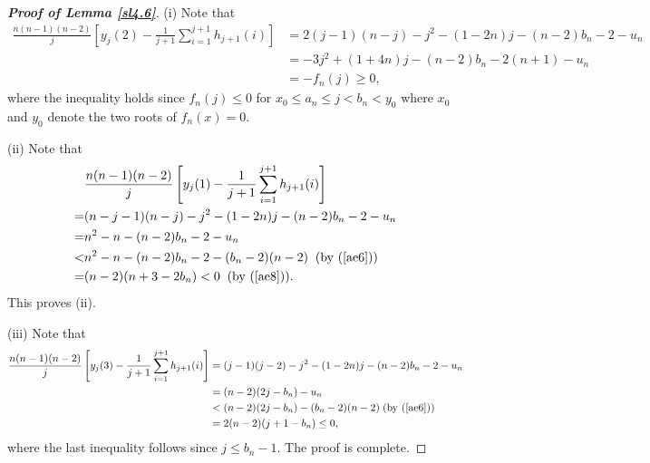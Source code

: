 \documentclass[12pt, A4paper, oneside]{article}
\theoremstyle{plain}
\numberwithin{equation}{section}
\begin{document}
\begin{proof}[\bf Proof of Lemma \ref{sl4.6}]
(i) Note that
\begin{align*}
\frac{n(n-1)(n-2)}{j}\left[y_j(2)-\frac{1}{j+1}\sum_{i=1}^{j+1}h_{j+1}(i)\right]&=2(j-1)(n-j)-j^2-(1-2n)j-(n-2)b_n-2-u_n\\
&=-3j^2+(1+4n)j-(n-2)b_n-2(n+1)-u_n\\
&=-f_n(j)\ge0,
\end{align*}
where the inequality holds since $f_n(j)\le0$ for $x_0\le a_n\le j<b_n<y_0$ where $x_0$ and $y_0$ denote the two roots of $f_n(x)=0$.

(ii) Note that
\begin{align*}
&\frac{n(n-1)(n-2)}{j}\left[y_j(1)-\frac{1}{j+1}\sum_{i=1}^{j+1}h_{j+1}(i)\right]\\
=&(n-j-1)(n-j)-j^2-(1-2n)j-(n-2)b_n-2-u_n\\
=&n^2-n-(n-2)b_n-2-u_n\\
<&n^2-n-(n-2)b_n-2-(b_n-2)(n-2)\;\;\mbox{(by (\ref{ae6}))}\\
=&(n-2)(n+3-2b_n)<0\;\;\mbox{(by (\ref{ae8}))}.
\end{align*}
This proves (ii).

(iii) Note that
\begin{align*}
\frac{n(n-1)(n-2)}{j}\left[y_j(3)-\frac{1}{j+1}\sum_{i=1}^{j+1}h_{j+1}(i)\right]&=(j-1)(j-2)-j^2-(1-2n)j-(n-2)b_n-2-u_n\\
&=(n-2)(2j-b_n)-u_n\\
&<(n-2)(2j-b_n)-(b_n-2)(n-2)\;\mbox{(by (\ref{ae6}))}\\
&=2(n-2)(j+1-b_n)\le0,
\end{align*}
where the last inequality follows since $j\le b_n-1$. The proof is complete.
\end{proof}
\end{document}
